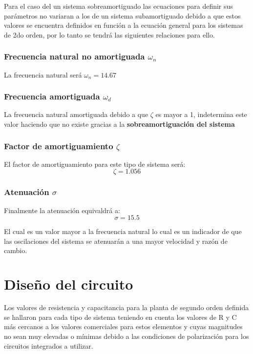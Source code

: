 \documentclass[conference]{IEEEtran}
\begin{document}
	Para el caso del un sistema sobreamortiguado las ecuaciones para definir sus parámetros no variaran a los de un sistema subamortiguado debido a que estos valores se encuentra definidos en función a la ecuación general para los sistemas de 2do orden, por lo tanto se tendrá las siguientes relaciones para ello.
	
	\subsubsection{Frecuencia natural no amortiguada $\omega_n$}
	
	La frecuencia natural será $ \omega_n = 14.67$
	
	\subsubsection{Frecuencia amortiguada $\omega_d$}
	La frecuencia natural amortiguada debido a que $\zeta$ es mayor a 1, indetermina este valor haciendo que no existe gracias a la \textbf{sobreamortiguación del sistema}
	
	\subsubsection{Factor de amortiguamiento $\zeta$}
	El factor de amortiguamiento para este tipo de sistema será:
	\begin{equation}
		\zeta = 1.056
		\label{eq:sobre-factor-amortiguamiento}
	\end{equation}
	
	\subsubsection{Atenuación $\sigma$}
	Finalmente la atenuación equivaldrá a:
	\begin{equation}
		\sigma = 15.5
	\end{equation}
	
	El cual es un valor mayor a la frecuencia natural lo cual es un indicador de que las oscilaciones del sistema se atenuarán a una mayor velocidad y razón de cambio.
	
	\section{Diseño del circuito}
	Los valores de resistencia y capacitancia para la planta de segundo orden definida se hallaron para cada tipo de sistema teniendo en cuenta los valores de R y C más cercanos a los valores comerciales para estos elementos y cuyas magnitudes no sean muy elevadas o mínimas debido a las condiciones de polarización para los circuitos integrados a utilizar.
	
\end{document}
